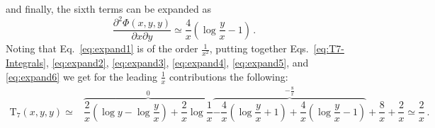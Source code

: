\documentclass[a4paper,11pt]{article}
\newcommand{\del}{\partial}
\renewcommand{\(}{\left(}
\renewcommand{\)}{\right)}
\renewcommand{\[}{\left[}
\renewcommand{\]}{\right]}
\newcommand{\ro}[1]{\textrm{#1}}
\begin{document}
and finally, the sixth terms can be expanded as
\begin{equation}
    \dfrac{\del^2 \Phi(x,y,y)}{\del x \del y} \simeq \dfrac{4}{x}\(\log \dfrac{y}{x} -1\)\,.
    \label{eq:expand6}
\end{equation}
Noting that Eq.~\eqref{eq:expand1} is of the order $\tfrac{1}{x^2}$, putting together Eqs.~\eqref{eq:T7-Integrals}, \eqref{eq:expand2}, \eqref{eq:expand3}, \eqref{eq:expand4}, \eqref{eq:expand5}, and \eqref{eq:expand6} we get for the leading $\tfrac{1}{x}$ contributions the following:
\begin{equation}
    \begin{aligned}
    \ro{T}_7\(x,y,y\) \simeq& \overbrace{\dfrac{2}{x} \( \log y - \log \dfrac{y}{x} \) + \dfrac{2}{x} \log \dfrac{1}{x}}^{0} \overbrace{-\dfrac{4}{x}\(\log \dfrac{y}{x} + 1 \) +
    \dfrac{4}{x}\(\log \dfrac{y}{x} -1\)}^{-\tfrac{8}{x}} + \dfrac{8}{x} + \dfrac{2}{x} \simeq \dfrac{2}{x}\,.
    \end{aligned}
    \label{eq:T7-expanded}
\end{equation}



 
\end{document}
